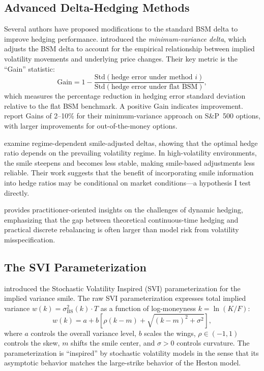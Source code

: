 \documentclass[12pt, letterpaper]{article}
\begin{document}
\subsection{Advanced Delta-Hedging Methods}

Several authors have proposed modifications to the standard BSM delta to improve hedging performance. \citet{Hull2017} introduced the \textit{minimum-variance delta}, which adjusts the BSM delta to account for the empirical relationship between implied volatility movements and underlying price changes. Their key metric is the ``Gain'' statistic:
\begin{equation}
    \text{Gain} = 1 - \frac{\text{Std}(\text{hedge error under method } i)}{\text{Std}(\text{hedge error under flat BSM})},
    \label{eq:gain}
\end{equation}
which measures the percentage reduction in hedging error standard deviation relative to the flat BSM benchmark. A positive Gain indicates improvement. \citet{Hull2017} report Gains of 2--10\% for their minimum-variance approach on S\&P~500 options, with larger improvements for out-of-the-money options.

\citet{Alexander2012} examine regime-dependent smile-adjusted deltas, showing that the optimal hedge ratio depends on the prevailing volatility regime. In high-volatility environments, the smile steepens and becomes less stable, making smile-based adjustments less reliable. Their work suggests that the benefit of incorporating smile information into hedge ratios may be conditional on market conditions---a hypothesis I test directly.

\citet{Taleb1997} provides practitioner-oriented insights on the challenges of dynamic hedging, emphasizing that the gap between theoretical continuous-time hedging and practical discrete rebalancing is often larger than model risk from volatility misspecification.

\subsection{The SVI Parameterization}

\citet{Gatheral2004} introduced the Stochastic Volatility Inspired (SVI) parameterization for the implied variance smile. The raw SVI parameterization expresses total implied variance $w(k) = \sigma^2_{\text{BS}}(k) \cdot T$ as a function of log-moneyness $k = \ln(K/F)$:
\begin{equation}
    w(k) = a + b\left[\rho(k - m) + \sqrt{(k - m)^2 + \sigma^2}\right],
    \label{eq:svi}
\end{equation}
where $a$ controls the overall variance level, $b$ scales the wings, $\rho \in (-1, 1)$ controls the skew, $m$ shifts the smile center, and $\sigma > 0$ controls curvature. The parameterization is ``inspired'' by stochastic volatility models in the sense that its asymptotic behavior matches the large-strike behavior of the Heston model.
\end{document}
